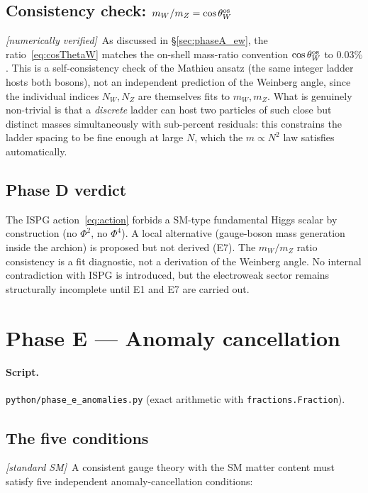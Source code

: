 \documentclass[11pt]{article}
\newcommand{\fromSM}{\textit{[standard SM]}}
\newcommand{\numerical}{\textit{[numerically verified]}}
\begin{document}
\subsection{Consistency check:
$m_W/m_Z=\cos\theta_W^{\rm os}$}

\numerical\ As discussed in \S\ref{sec:phaseA_ew}, the
ratio~\eqref{eq:cosThetaW} matches the on-shell mass-ratio
convention $\cos\theta_W^{\rm os}$ to $0.03\%$. This is a
self-consistency check of the Mathieu
ansatz (the same integer ladder hosts both bosons), not an
independent prediction of the Weinberg angle, since the individual
indices $N_W,N_Z$ are themselves fits to $m_W,m_Z$. What is
genuinely non-trivial is that a \emph{discrete} ladder can
host two particles of such close but distinct masses
simultaneously with sub-percent residuals: this constrains
the ladder spacing to be fine enough at large $N$, which the
$m\propto N^2$ law satisfies automatically.

\subsection{Phase D verdict}

The ISPG action~\eqref{eq:action} forbids a SM-type fundamental
Higgs scalar by construction (no $\Phi^2$, no $\Phi^4$). A
local alternative (gauge-boson mass generation inside the
archion) is proposed but not derived (E7). The $m_W/m_Z$ ratio
consistency is a fit diagnostic, not a derivation of the
Weinberg angle. No internal contradiction with ISPG is
introduced, but the electroweak sector remains structurally
incomplete until E1 and E7 are carried out.

\section{Phase E --- Anomaly cancellation}
\label{sec:phaseE}

\paragraph{Script.} \texttt{python/phase\_e\_anomalies.py}
(exact arithmetic with \texttt{fractions.Fraction}).

\subsection{The five conditions}

\fromSM\ A consistent gauge theory with the SM matter content
must satisfy five independent anomaly-cancellation conditions:
\end{document}
